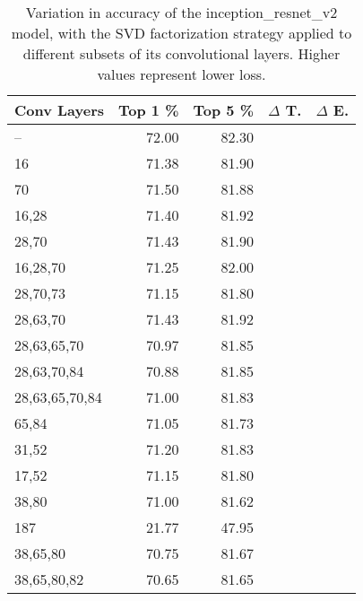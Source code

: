 \begin{table}
\centering
\begin{tabular}{|l|r|r|r|r|}
\hline
Conv Layers & Top 1 \% & Top 5 \% & $\Delta$ T. & $\Delta$ E. \\\hline
-- & 72.00 & 82.30 &  & \\\hline
16 & 71.38 & 81.90 &  &  \\\hline
70 & 71.50 & 81.88 &  &  \\\hline
16,28 & 71.40 & 81.92 &  &  \\\hline
28,70 & 71.43 & 81.90 &  &  \\\hline
16,28,70 & 71.25 & 82.00 &  &  \\\hline
28,70,73 & 71.15 & 81.80 &  &  \\\hline
28,63,70 & 71.43 & 81.92 &  &  \\\hline
28,63,65,70 & 70.97 & 81.85 &  &  \\\hline
28,63,70,84 & 70.88 & 81.85 &  &  \\\hline
28,63,65,70,84 & 71.00 & 81.83 &  &  \\\hline
65,84 & 71.05 & 81.73 &  &  \\\hline
31,52 & 71.20 & 81.83 &  &  \\\hline
17,52 & 71.15 & 81.80 &  &  \\\hline
38,80 & 71.00 & 81.62 &  &  \\\hline
187 & 21.77 & 47.95 &  &  \\\hline
38,65,80 & 70.75 & 81.67 &  &  \\\hline
38,65,80,82 & 70.65 & 81.65 &  &  \\\hline
\end{tabular}
\caption{Variation in accuracy of the inception\_resnet\_v2 model, with the SVD factorization strategy applied to different subsets of its convolutional layers. Higher values represent lower loss.}
\label{inception_resnet_v2-accuracy}
\end{table}
